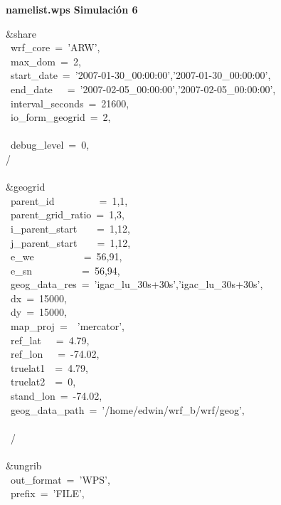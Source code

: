 %
%


\textbf{namelist.wps Simulación 6}

\&share\\
~wrf\_core~=~'ARW',\\
~max\_dom~=~2,\\
~start\_date~=~'2007-01-30\_00:00:00','2007-01-30\_00:00:00',\\
~end\_date~~~=~'2007-02-05\_00:00:00','2007-02-05\_00:00:00',\\
~interval\_seconds~=~21600,\\
~io\_form\_geogrid~=~2,\\
\\
~debug\_level~=~0,\\
/\\
\\
\&geogrid\\
~parent\_id~~~~~~~~~=~1,1,\\
~parent\_grid\_ratio~=~1,3,\\
~i\_parent\_start~~~~=~1,12,\\
~j\_parent\_start~~~~=~1,12,\\
~e\_we~~~~~~~~~~=~56,91,\\
~e\_sn~~~~~~~~~~=~56,94,\\
~geog\_data\_res~=~'igac\_lu\_30s+30s','igac\_lu\_30s+30s',\\
~dx~=~15000,\\
~dy~=~15000,\\
~map\_proj~=~~'mercator',\\
~ref\_lat~~~=~4.79,\\
~ref\_lon~~~=~-74.02,\\
~truelat1~~=~4.79,\\
~truelat2~~=~0,\\
~stand\_lon~=~-74.02,\\
~geog\_data\_path~=~'/home/edwin/wrf\_b/wrf/geog',\\
\\
~/\\
\\
\&ungrib\\
~out\_format~=~'WPS',\\
~prefix~=~'FILE',\\
/\\
\\
\&metgrid\\
~fg\_name~=~'FILE',\\
~io\_form\_metgrid~=~2,\\
\\

